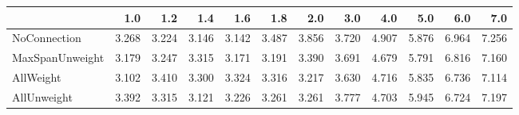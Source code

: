 \begin{tabular}{lrrrrrrrrrrr}
\toprule
{} &   1.0 &   1.2 &   1.4 &   1.6 &   1.8 &   2.0 &   3.0 &   4.0 &   5.0 &   6.0 &   7.0 \\
\midrule
NoConnection    & 3.268 & 3.224 & 3.146 & 3.142 & 3.487 & 3.856 & 3.720 & 4.907 & 5.876 & 6.964 & 7.256 \\
MaxSpanUnweight & 3.179 & 3.247 & 3.315 & 3.171 & 3.191 & 3.390 & 3.691 & 4.679 & 5.791 & 6.816 & 7.160 \\
AllWeight       & 3.102 & 3.410 & 3.300 & 3.324 & 3.316 & 3.217 & 3.630 & 4.716 & 5.835 & 6.736 & 7.114 \\
AllUnweight     & 3.392 & 3.315 & 3.121 & 3.226 & 3.261 & 3.261 & 3.777 & 4.703 & 5.945 & 6.724 & 7.197 \\
\bottomrule
\end{tabular}
